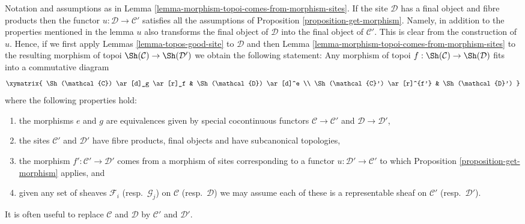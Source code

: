 \begin{remark}
\label{remark-morphism-topoi-comes-from-morphism-sites}
Notation and assumptions
as in Lemma \ref{lemma-morphism-topoi-comes-from-morphism-sites}.
If the site $\mathcal{D}$ has a final object and fibre products
then the functor $u : \mathcal{D} \to \mathcal{C}'$ satisfies
all the assumptions of Proposition \ref{proposition-get-morphism}.
Namely, in addition to the properties mentioned in the lemma $u$
also transforms the final object of $\mathcal{D}$ into the final
object of $\mathcal{C}'$. This is clear from the construction of $u$.
Hence, if we first apply
Lemmas \ref{lemma-topos-good-site}
to $\mathcal{D}$
and then
Lemma \ref{lemma-morphism-topoi-comes-from-morphism-sites}
to the resulting morphism of topoi
$\Sh(\mathcal{C}) \to \Sh(\mathcal{D}')$
we obtain the following statement:
Any morphism of topoi
$f : \Sh(\mathcal{C}) \to \Sh(\mathcal{D})$
fits into a commutative diagram
$$
\xymatrix{
\Sh(\mathcal{C}) \ar[d]_g \ar[r]_f &
\Sh(\mathcal{D}) \ar[d]^e \\
\Sh(\mathcal{C}') \ar[r]^{f'} &
\Sh(\mathcal{D}')
}
$$
where the following properties hold:
\begin{enumerate}
\item the morphisms $e$ and $g$ are equivalences given by
special cocontinuous functors $\mathcal{C} \to \mathcal{C}'$ and
$\mathcal{D} \to \mathcal{D}'$,
\item the sites $\mathcal{C}'$ and $\mathcal{D}'$ have fibre products, final
objects and have subcanonical topologies,
\item the morphism $f' : \mathcal{C}' \to \mathcal{D}'$ comes from a
morphism of sites corresponding to a functor
$u : \mathcal{D}' \to \mathcal{C}'$ to which
Proposition \ref{proposition-get-morphism}
applies, and
\item given any set of sheaves $\mathcal{F}_i$ (resp.\ $\mathcal{G}_j$)
on $\mathcal{C}$ (resp.\ $\mathcal{D}$) we may assume each of these is
a representable sheaf on $\mathcal{C}'$ (resp.\ $\mathcal{D}'$).
\end{enumerate}
It is often useful to replace $\mathcal{C}$ and $\mathcal{D}$ by
$\mathcal{C}'$ and $\mathcal{D}'$.
\end{remark}

